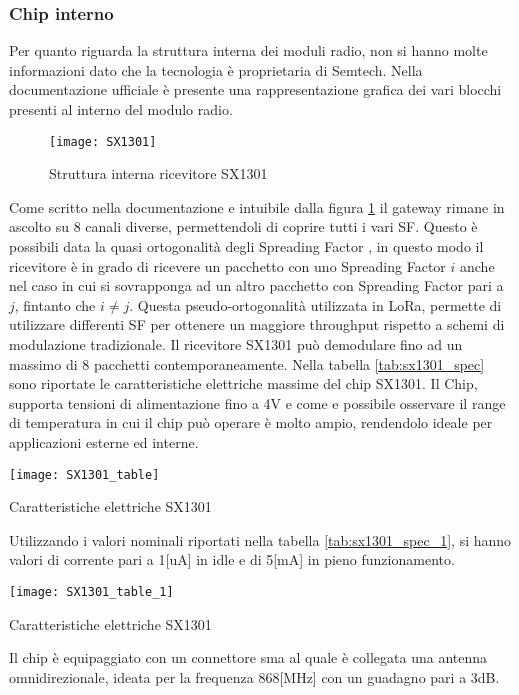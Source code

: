 \subsubsection{Chip interno}
Per quanto riguarda la struttura interna dei moduli radio, non si hanno molte
informazioni dato che la tecnologia è proprietaria di Semtech. Nella
documentazione ufficiale è presente una rappresentazione grafica dei vari
blocchi presenti al interno del modulo radio.

\begin{figure}[h]
        \centering 
                \texttt{[image: SX1301]}
        \caption{Struttura interna ricevitore SX1301}
        \label{fig:sx1301}
\end{figure}

Come scritto nella documentazione   e intuibile dalla
figura \ref{fig:sx1301} il gateway rimane in ascolto su 8 
canali diverse,  permettendoli di coprire tutti i vari SF. 
Questo è possibili data la quasi ortogonalità degli Spreading Factor
, in questo modo il ricevitore è in grado di ricevere un pacchetto
con uno Spreading Factor $i$ anche nel caso in cui si sovrapponga ad un altro
pacchetto con Spreading Factor pari a $j$, fintanto che $i\neq j$. Questa
pseudo-ortogonalità utilizzata in LoRa, permette di utilizzare differenti SF per
ottenere un maggiore throughput rispetto a schemi di modulazione tradizionale.
Il ricevitore  SX1301 può demodulare fino ad un massimo di 8 pacchetti
contemporaneamente.
Nella tabella \ref{tab:sx1301_spec} sono riportate le caratteristiche elettriche
massime del  chip SX1301. Il Chip, supporta tensioni di
alimentazione fino a 4V e  come e possibile osservare il range di temperatura in cui il
chip può operare è molto ampio, rendendolo ideale per applicazioni esterne ed
interne. 

\begin{table}[h]
        \centering 
                \texttt{[image: SX1301\_table]}
        \caption{Caratteristiche elettriche SX1301}
\label{tab:sx1301_spec}
\end{table}
Utilizzando i valori nominali riportati nella tabella \ref{tab:sx1301_spec_1},
si hanno valori di corrente pari a 1[uA] in idle  e di 5[mA] in pieno
funzionamento.
\begin{table}[h]
        \centering 
                \texttt{[image: SX1301\_table\_1]}
        \caption{Caratteristiche elettriche SX1301}
        \label{tab:sx1301_spec_1}
\end{table}
Il chip è equipaggiato con un connettore sma al quale è collegata una
antenna omnidirezionale, ideata per la frequenza 868[MHz] con un guadagno pari a 3dB.

